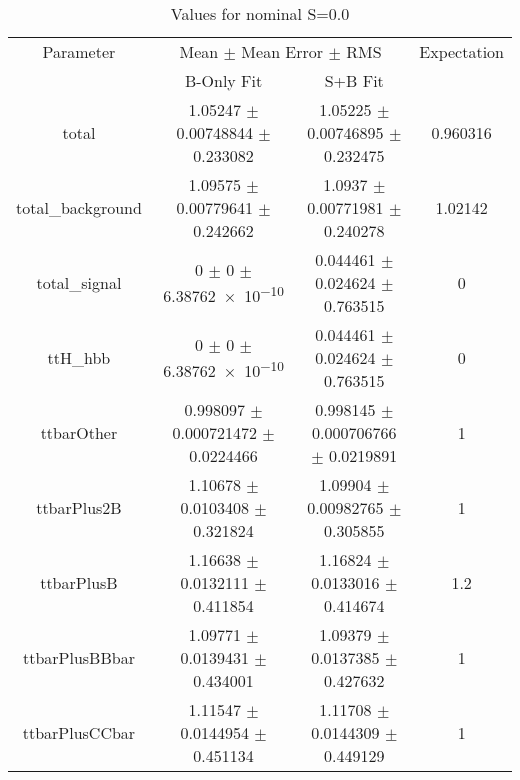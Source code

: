 \begin{table}
\centering
\caption{Values for nominal S=0.0}
\begin{tabular}{cccc}
\toprule
Parameter & \multicolumn{2}{c}{Mean $\pm$ Mean Error $\pm$ RMS} & Expectation\\
 & B-Only Fit & S+B Fit & \\
\midrule
total & \num{1.05247} $\pm$ \num{0.00748844} $\pm$ \num{0.233082} & \num{1.05225} $\pm$ \num{0.00746895} $\pm$ \num{0.232475} & \num{0.960316}\\
total\_background & \num{1.09575} $\pm$ \num{0.00779641} $\pm$ \num{0.242662} & \num{1.0937} $\pm$ \num{0.00771981} $\pm$ \num{0.240278} & \num{1.02142}\\
total\_signal & \num{0} $\pm$ \num{0} $\pm$ \num{6.38762e-10} & \num{0.044461} $\pm$ \num{0.024624} $\pm$ \num{0.763515} & \num{0}\\
ttH\_hbb & \num{0} $\pm$ \num{0} $\pm$ \num{6.38762e-10} & \num{0.044461} $\pm$ \num{0.024624} $\pm$ \num{0.763515} & \num{0}\\
ttbarOther & \num{0.998097} $\pm$ \num{0.000721472} $\pm$ \num{0.0224466} & \num{0.998145} $\pm$ \num{0.000706766} $\pm$ \num{0.0219891} & \num{1}\\
ttbarPlus2B & \num{1.10678} $\pm$ \num{0.0103408} $\pm$ \num{0.321824} & \num{1.09904} $\pm$ \num{0.00982765} $\pm$ \num{0.305855} & \num{1}\\
ttbarPlusB & \num{1.16638} $\pm$ \num{0.0132111} $\pm$ \num{0.411854} & \num{1.16824} $\pm$ \num{0.0133016} $\pm$ \num{0.414674} & \num{1.2}\\
ttbarPlusBBbar & \num{1.09771} $\pm$ \num{0.0139431} $\pm$ \num{0.434001} & \num{1.09379} $\pm$ \num{0.0137385} $\pm$ \num{0.427632} & \num{1}\\
ttbarPlusCCbar & \num{1.11547} $\pm$ \num{0.0144954} $\pm$ \num{0.451134} & \num{1.11708} $\pm$ \num{0.0144309} $\pm$ \num{0.449129} & \num{1}\\
\bottomrule
\end{tabular}
\end{table}